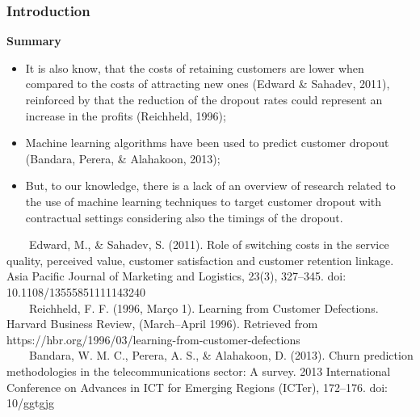 \documentclass[10pt]{beamer}
\begin{document}
\begin{frame}
	\frametitle{Introduction}
	\Large
	\textbf{Summary}\\
		\begin{itemize} \normalsize

			\item It is also know, that the costs of retaining customers are lower when compared to the costs of attracting new ones \footnotesize(Edward \& Sahadev, 2011)\normalsize, reinforced by that the reduction of the dropout rates could represent an increase in the profits \footnotesize(Reichheld, 1996)\normalsize;
			\item Machine learning algorithms have been used to predict customer dropout \footnotesize(Bandara, Perera, \& Alahakoon, 2013)\normalsize;
			\item But, to our knowledge, there is a lack of an overview of research related to the use of machine learning techniques to target customer dropout with contractual settings considering also the timings of the dropout.
			
		\end{itemize}	
	\tiny
	~~~~Edward, M., \& Sahadev, S. (2011). Role of switching costs in the service quality, perceived value, customer satisfaction and customer retention linkage. Asia Pacific Journal of Marketing and Logistics, 23(3), 327–345. doi: 10.1108/13555851111143240 \\
	~~~~Reichheld, F. F. (1996, Março 1). Learning from Customer Defections. Harvard Business Review, (March–April 1996). Retrieved from https://hbr.org/1996/03/learning-from-customer-defections \\
	~~~~Bandara, W. M. C., Perera, A. S., \& Alahakoon, D. (2013). Churn prediction methodologies in the telecommunications sector: A survey. 2013 International Conference on Advances in ICT for Emerging Regions (ICTer), 172–176. doi: 10/ggtgjg\\
\end{frame}
\end{document}

